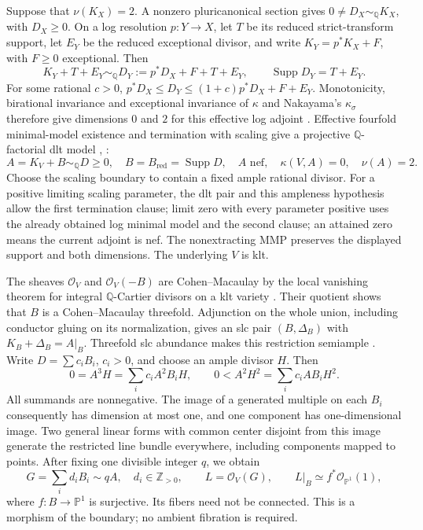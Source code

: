 Suppose that $\nu(K_X)=2$.  A nonzero pluricanonical section gives
$0\ne D_X\sim_{\mathbb Q}K_X$, with $D_X\ge0$.  On a log resolution
$p:Y\to X$, let $T$ be its reduced strict-transform support, let $E_Y$
be the reduced exceptional divisor, and write $K_Y=p^*K_X+F$, with
$F\ge0$ exceptional.  Then
\[
 K_Y+T+E_Y\sim_{\mathbb Q}D_Y:=p^*D_X+F+T+E_Y,
 \qquad \operatorname{Supp}D_Y=T+E_Y.
\]
For some rational $c>0$,
$p^*D_X\le D_Y\le(1+c)p^*D_X+F+E_Y$.
Monotonicity, birational invariance and exceptional invariance of
$\kappa$ and Nakayama's $\kappa_\sigma$ therefore give dimensions
$0$ and $2$ for this effective log adjoint
\cite[v1, Lemma~2.5 and proof of Lemma~4.1]{LiuXu2025}.
Effective fourfold minimal-model existence and termination with scaling
give a projective $\mathbb Q$-factorial dlt model
\cite[Corollary~D(i), Lemma~2.9(i)]{LazicTsakanikas2022},
\cite[Theorem~4.1(ii),(iii)]{Birkar2012}:
\begin{equation}\label{nu2:eq:model}
 A=K_V+B\sim_{\mathbb Q}D\ge0,\quad
 B=B_{\mathrm{red}}=\operatorname{Supp}D,\quad
 A\text{ nef},\quad \kappa(V,A)=0,\quad\nu(A)=2.
\end{equation}
Choose the scaling boundary to contain a fixed ample rational divisor.
For a positive limiting scaling parameter, the dlt pair and this
ampleness hypothesis allow the first termination clause; limit zero with every parameter positive uses the
already obtained log minimal model and the second clause; an attained
zero means the current adjoint is nef.  The nonextracting MMP preserves
the displayed support and both dimensions.  The underlying $V$ is klt.

The sheaves $\mathcal O_V$ and $\mathcal O_V(-B)$ are
Cohen--Macaulay by the local vanishing theorem for integral
$\mathbb Q$-Cartier divisors on a klt variety
\cite[Theorem~2 and Example~4.1]{KollarLocal2011}.  Their quotient shows
that $B$ is a Cohen--Macaulay threefold.  Adjunction on the whole union,
including conductor gluing on its normalization, gives an slc pair
$(B,\Delta_B)$ with $K_B+\Delta_B=A|_B$.
Threefold slc abundance makes this restriction semiample
\cite[Theorem~0.1]{Fujino2000}.
Write $D=\sum c_iB_i$, $c_i>0$, and choose an ample divisor $H$.  Then
\[
 0=A^3H=\sum_i c_iA^2B_iH,
 \qquad 0<A^2H^2=\sum_i c_iAB_iH^2.
\]
All summands are nonnegative.  The image of a generated multiple on
each $B_i$ consequently has dimension at most one, and one component
has one-dimensional image.  Two general linear forms with common
center disjoint from this image generate the restricted line bundle
everywhere, including components mapped to points.  After fixing one
divisible integer $q$, we obtain
\begin{equation}\label{nu2:eq:pencil}
 G=\sum_i d_iB_i\sim qA,\quad d_i\in\mathbb Z_{>0},\qquad
 L=\mathcal O_V(G),\qquad
 L|_B\simeq f^*\mathcal O_{\mathbb P^1}(1),
\end{equation}
where $f:B\to\mathbb P^1$ is surjective.  Its fibers need not be
connected.  This is a morphism of the boundary; no ambient fibration
is required.

